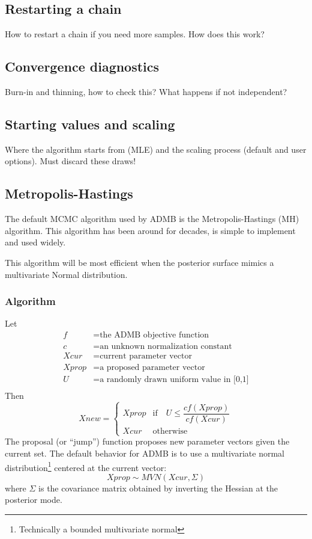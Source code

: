 \documentclass{article}
\begin{document}
\subsection{Restarting a chain}\label{sec:restart}
How to restart a chain if you need more samples. How does this work?
\subsection{Convergence diagnostics} \label{sec:diag}
Burn-in and thinning, how to check this? What happens if not
independent? 
\subsection{Starting values and scaling}\label{sec:startvals}
Where the algorithm starts from (MLE) and the scaling process
(default and user options). Must discard these draws!
\subsection{Metropolis-Hastings}\label{sec:MH}
The default MCMC algorithm used by ADMB is the
Metropolis-Hastings (MH) algorithm. This algorithm has been
around for decades, is simple to implement and used widely.

This algorithm will be most efficient when the posterior
surface mimics a multivariate Normal distribution.

\subsubsection{Algorithm}
Let
\begin{align*}
  f&=\text{the ADMB objective function}\\
  c&=\text{an unknown normalization constant}\\
  Xcur&=\text{current parameter vector}\\
  Xprop&=\text{a proposed parameter vector}\\
  U&=\text{a randomly drawn uniform value in [0,1]}\\
\end{align*}
Then
\begin{equation}
  Xnew=
  \begin{cases}
    Xprop & \text{if} \quad U\leq \dfrac{cf(Xprop)}{cf(Xcur)}\\
    Xcur & \text{otherwise}
  \end{cases}
\end{equation}
The proposal (or ``jump'') function proposes new parameter
vectors given the current set. The default behavior for ADMB
is to use a multivariate normal
distribution\footnote{Technically a bounded multivariate
  normal} centered at the current vector:
\begin{equation*}
  Xprop\sim MVN(Xcur, \Sigma)
\end{equation*}
 where $\Sigma$ is the covariance matrix obtained by
 inverting the Hessian at the posterior mode. 
\end{document}
